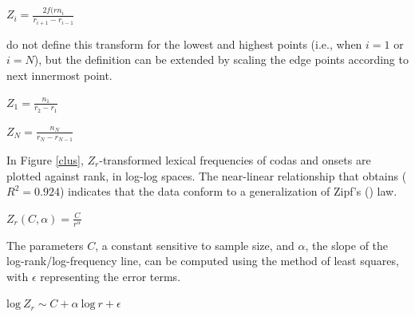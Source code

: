 \begin{unlabeledexample}
$\displaystyle Z_i = \frac{2 f(rn_i}{r_{i + 1} - r_{i - 1}}$
\end{unlabeledexample}

\noindent \citeauthor{Church1991} do not define this transform for the lowest and highest points (i.e., when $i = 1$ or $i = N$), but the definition can be extended by scaling the edge points according to next innermost point.

\begin{unlabeledexample}
$\displaystyle Z_1 = \frac{n_1}{r_2 - r_1}$
\end{unlabeledexample}

\begin{unlabeledexample}
$\displaystyle Z_N = \frac{n_N}{r_N - r_{N - 1}}$
\end{unlabeledexample}

In Figure \ref{clus}, $Z_r$-transformed lexical frequencies of codas and onsets are plotted against rank, in log-log spaces. The near-linear relationship that obtains ($R^2 = 0.924$) indicates that the data conform to a generalization of Zipf's (\citeyear{Zipf1949}) law.

\begin{unlabeledexample}
$\displaystyle Z_r(C, \alpha) = \frac{C}{r^\alpha}$
\end{unlabeledexample}

\noindent The parameters $C$, a constant sensitive to sample size, and $\alpha$, the slope of the log-rank/log-frequency line, can be computed using the method of least squares, with $\epsilon$ representing the error terms.

\begin{unlabeledexample}
$\displaystyle \textrm{log}~Z_r \sim C + \alpha~\textrm{log}~r + \epsilon$ 
\end{unlabeledexample}

